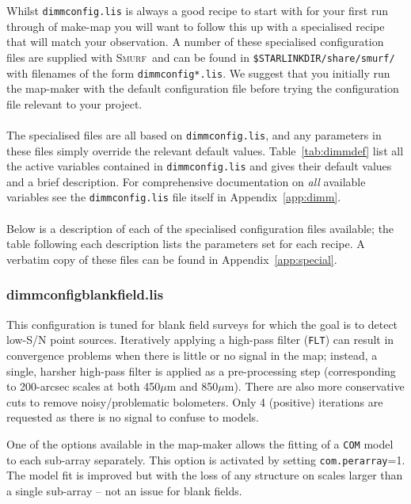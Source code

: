 \documentclass[twoside,11pt]{article}
\newcommand{\xref}[3]{#1}
\renewcommand{\_}{\texttt{\symbol{95}}}
\newcommand{\smurf}{\xref{\textsc{Smurf}}{sun258}{}}
\begin{document}
Whilst \texttt{dimmconfig.lis} is always a good recipe to start with
for your first run through of make-map you will want to follow this up
with a specialised recipe that will match your observation. A number
of these specialised configuration files are supplied with \smurf\ and
can be found in \texttt{\$STARLINK\_DIR/share/smurf/} with filenames
of the form \texttt{dimmconfig*.lis}. We suggest that you initially
run the map-maker with the default configuration file before trying
the configuration file relevant to your project.
\\ \\
The specialised files are all based on \texttt{dimmconfig.lis}, and
any parameters in these files simply override the relevant default
values.  Table~\ref{tab:dimmdef} list all the active variables
contained in \texttt{dimmconfig.lis} and gives their default values
and a brief description. For comprehensive documentation on \emph{all}
available variables see the \texttt{dimmconfig.lis} file itself in
Appendix~\ref{app:dimm}.
\\ \\
Below is a description of each of the specialised configuration files
available; the table following each description lists the parameters
set for each recipe. A verbatim copy of these files can be found in
Appendix~\ref{app:special}.

\subsubsection{dimmconfig\_blank\_field.lis}

This configuration is tuned for blank field surveys for which the goal
is to detect low-S/N point sources. Iteratively applying a high-pass
filter (\texttt{FLT}) can result in convergence problems when there is
little or no signal in the map; instead, a single, harsher high-pass
filter is applied as a pre-processing step (corresponding to
200-arcsec scales at both 450$\mu$m and 850$\mu$m). There are also
more conservative cuts to remove noisy/problematic bolometers. Only 4
(positive) iterations are requested as there is no signal to confuse
to models.

One of the options available in the map-maker allows the fitting of a
\texttt{COM} model to each sub-array separately. This option is
activated by setting \texttt{com.perarray}=1. The model fit is
improved but with the loss of any structure on scales larger than a
single sub-array -- not an issue for blank fields.
\end{document}
